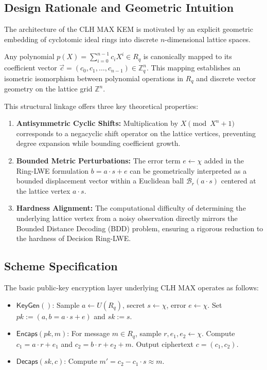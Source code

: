 \documentclass[11pt,a4paper]{article}
\begin{document}
\subsection{Design Rationale and Geometric Intuition}
\label{subsec:design_rationale}
The architecture of the \textsc{CLH MAX} KEM is motivated by an explicit geometric embedding of cyclotomic ideal rings into discrete $n$-dimensional lattice spaces.

Any polynomial $p(X) = \sum_{i=0}^{n-1} c_i X^i \in R_q$ is canonically mapped to its coefficient vector $\vec{c} = (c_0, c_1, \dots, c_{n-1}) \in \mathbb{Z}_q^n$. This mapping establishes an isometric isomorphism between polynomial operations in $R_q$ and discrete vector geometry on the lattice grid $\mathbb{Z}^n$.

This structural linkage offers three key theoretical properties:
\begin{enumerate}
    \item \textbf{Antisymmetric Cyclic Shifts:} Multiplication by $X \pmod{X^n + 1}$ corresponds to a negacyclic shift operator on the lattice vertices, preventing degree expansion while bounding coefficient growth.
    \item \textbf{Bounded Metric Perturbations:} The error term $e \leftarrow \chi$ added in the Ring-LWE formulation $b = a \cdot s + e$ can be geometrically interpreted as a bounded displacement vector within a Euclidean ball $\mathcal{B}_r(a \cdot s)$ centered at the lattice vertex $a \cdot s$.
    \item \textbf{Hardness Alignment:} The computational difficulty of determining the underlying lattice vertex from a noisy observation directly mirrors the Bounded Distance Decoding (BDD) problem, ensuring a rigorous reduction to the hardness of Decision Ring-LWE.
\end{enumerate}

\subsection{Scheme Specification}
The basic public-key encryption layer underlying \textsc{CLH MAX} operates as follows:
\begin{itemize}
    \item $\textsf{KeyGen}()$: Sample $a \leftarrow U(R_q)$, secret $s \leftarrow \chi$, error $e \leftarrow \chi$. Set $pk := (a, b = a \cdot s + e)$ and $sk := s$.
    \item $\textsf{Encaps}(pk, m)$: For message $m \in R_q$, sample $r, e_1, e_2 \leftarrow \chi$. Compute $c_1 = a \cdot r + e_1$ and $c_2 = b \cdot r + e_2 + m$. Output ciphertext $c = (c_1, c_2)$.
    \item $\textsf{Decaps}(sk, c)$: Compute $m' = c_2 - c_1 \cdot s \approx m$.
\end{itemize}
\end{document}
